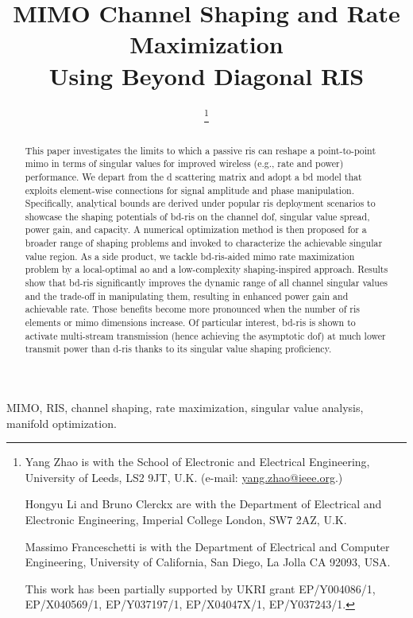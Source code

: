 \documentclass[journal]{IEEEtran}
\title{MIMO Channel Shaping and Rate Maximization\\Using Beyond Diagonal RIS}
\author{
	\IEEEauthorblockN{
		Yang Zhao, \IEEEmembership{Member, IEEE,}
		Hongyu Li, \IEEEmembership{Graduate Student Member, IEEE,}\\
		Massimo Franceschetti, \IEEEmembership{Fellow, IEEE,}
		and Bruno Clerckx, \IEEEmembership{Fellow, IEEE}
	}
	\thanks{
		Yang Zhao is with the School of Electronic and Electrical Engineering, University of Leeds, LS2 9JT, U.K. (e-mail: \href{mailto:yang.zhao@ieee.org}{yang.zhao@ieee.org}.)

		Hongyu Li and Bruno Clerckx are with the Department of Electrical and Electronic Engineering, Imperial College London, SW7 2AZ, U.K.

		Massimo Franceschetti is with the Department of Electrical and Computer Engineering, University of California, San Diego, La Jolla CA 92093, USA.

		This work has been partially supported by UKRI grant EP/Y004086/1, EP/X040569/1, EP/Y037197/1, EP/X04047X/1, EP/Y037243/1.
	}
}
\begin{document}
\maketitle

\begin{abstract}
	This paper investigates the limits to which a passive \gls{ris} can reshape a point-to-point \gls{mimo} in terms of singular values for improved wireless (e.g., rate and power) performance.
	We depart from the \gls{d} scattering matrix and adopt a \gls{bd} model that exploits element-wise connections for signal amplitude and phase manipulation.
	Specifically, analytical bounds are derived under popular \gls{ris} deployment scenarios to showcase the shaping potentials of \gls{bd}-\gls{ris} on the channel \gls{dof}, singular value spread, power gain, and capacity.
	A numerical optimization method is then proposed for a broader range of shaping problems and invoked to characterize the achievable singular value region.
	As a side product, we tackle \gls{bd}-\gls{ris}-aided \gls{mimo} rate maximization problem by a local-optimal \gls{ao} and a low-complexity shaping-inspired approach.
	Results show that \gls{bd}-\gls{ris} significantly improves the dynamic range of all channel singular values and the trade-off in manipulating them, resulting in enhanced power gain and achievable rate.
	Those benefits become more pronounced when the number of \gls{ris} elements or \gls{mimo} dimensions increase.
	Of particular interest, \gls{bd}-\gls{ris} is shown to activate multi-stream transmission (hence achieving the asymptotic \gls{dof}) at much lower transmit power than \gls{d}-\gls{ris} thanks to its singular value shaping proficiency.
\end{abstract}

\begin{IEEEkeywords}
	MIMO, RIS, channel shaping, rate maximization, singular value analysis, manifold optimization.
\end{IEEEkeywords}

\glsresetall
\end{document}

